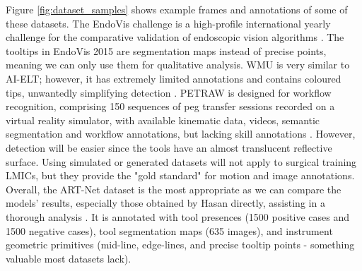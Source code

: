 Figure \ref{fig:dataset_samples} shows example frames and annotations of some of these datasets. The EndoVis challenge is a high-profile international yearly challenge for the comparative validation of endoscopic vision algorithms \cite{fernandes_future_2023}. The tooltips in EndoVis 2015  are segmentation maps instead of precise points, meaning we can only use them for qualitative analysis. WMU is very similar to AI-ELT; however, it has extremely limited annotations and contains coloured tips, unwantedly simplifying detection \cite{fathabadi_box-trainer_2022}. PETRAW is designed for workflow recognition, comprising 150 sequences of peg transfer sessions recorded on a virtual reality simulator, with available kinematic data, videos, semantic segmentation and workflow annotations, but lacking skill annotations \cite{alabi_multitask_2024, huaulme_peg_2022}. However, detection will be easier since the tools have an almost translucent reflective surface. Using simulated or generated datasets \cite{cartucho_visionblender_2021} will not apply to surgical training LMICs, but they provide the "gold standard" for motion and image annotations. Overall, the ART-Net dataset is the most appropriate as we can compare the models' results, especially those obtained by Hasan directly, assisting in a thorough analysis \cite{hasan_detection_2021}. It is annotated with tool presences (1500 positive cases and 1500 negative cases), tool segmentation maps (635 images), and instrument geometric primitives (mid-line, edge-lines, and precise tooltip points - something valuable most datasets lack).
